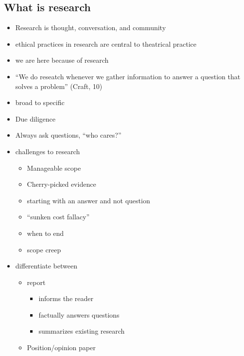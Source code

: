 \documentclass[12pt]{article}
\begin{document}
        \subsection{What is research}
            \begin{itemize}
                \item Research is thought, conversation, and community
                \item ethical practices in research are central to theatrical practice
                \item we are here because of research
                \item ``We do reseatch whenever we gather information to answer a question that solves a problem'' (Craft, 10)
                \item broad to specific
                \item Due diligence
                \item Always ask questions, ``who cares?''
                \item challenges to research
                \begin{itemize}
                    \item Manageable scope
                    \item Cherry-picked evidence
                    \item starting with an answer and not question
                    \item ``sunken cost fallacy''
                    \item when to end
                    \item scope creep
                \end{itemize}
                \item differentiate between
                \begin{itemize}
                    \item report
                    \begin{itemize}
                        \item informs the reader
                        \item factually answers questions
                        \item summarizes existing research
                    \end{itemize}
                    \item Position/opinion paper
                    \begin{itemize}

\end{itemize}
\end{itemize}
\end{itemize}
\end{document}
